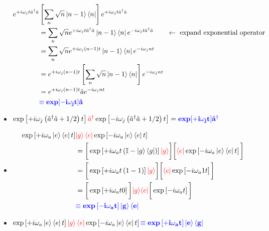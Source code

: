 \begin{itemize}
    \begin{equation}
      \begin{aligned}
  	e^{+i\omega_jt\hat{a}^\dagger\hat a} & \left[\sum_n\sqrt{n}\ket{n-1}\bra{n}\right]e^{+i\omega_jt\hat{a}^\dagger\hat a}\\
  	& = \sum_n \sqrt{n}e^{+i\omega_jt\hat{a}^\dagger\hat a}\ket{n-1}\bra{n}e^{-i\omega_jt\hat{a}^\dagger\hat a} \qquad \leftarrow\text{ expand exponential operator}\\
  	& = \sum_n \sqrt{n}e^{+i\omega_j(n-1)t}\ket{n-1}\bra{n}e^{-i\omega_jnt}\\
  	& = e^{+i\omega_j(n-1)t}\left[\sum_n \sqrt{n}\ket{n-1}\bra{n}\right]e^{-i\omega_jnt}\\
  	&     =    e^{+i\omega_j(n-1)t}\hat{a}e^{-i\omega_jnt}\\     &    \textcolor{blue}{\mathbf{\equiv
            \text{\textbf{exp}}[-i\omega_jt]\hat{a}}}
      \end{aligned}
    \end{equation}
  	
  \item
    $\exp\left[+i\omega_j\left(\hat{a}^\dagger\hat{a}+{1}/{2}\right)t\right]\textcolor{red}{\hat{a}^\dagger}\exp\left[-i\omega_j\left(\hat{a}^\dagger\hat{a}+{1}/{2}\right)t\right]
    = \textcolor{blue}{\mathbf{\text{\textbf{exp}}[+i\omega_jt]\hat{a}^\dagger}}$
  	
  \item \begin{equation}
      \begin{aligned}
  	\exp\left[+i\omega_a\ket{e}\bra{e}t\right]&\textcolor{red}{\ket{g}\bra{e}}\exp\left[-i\omega_a\ket{e}\bra{e}t\right] \\
  	& = \bigg[\exp\left[+i\omega_at\left(\mathbb{I} - \ket{g}\bra{g}\right)\right]\textcolor{red}{\ket{g}}\bigg]\bigg[\textcolor{red}{\bra{e}}\exp\left[-i\omega_a\ket{e}\bra{e}t\right]\bigg]\\
  	& = \bigg[\exp\left[+i\omega_at\left(1 - 1\right)\right]\textcolor{red}{\ket{g}}\bigg]\bigg[\textcolor{red}{\bra{e}}\exp\left[-i\omega_a1t\right]\bigg]\\
  	& = \bigg[\exp\left[+i\omega_at0\right]\bigg]\textcolor{red}{\ket{g}}\textcolor{red}{\bra{e}}\bigg[\exp\left[-i\omega_at\right]\bigg]\\
  	& \textcolor{blue}{\mathbf{\equiv \text{\textbf{exp}}\left[-i\omega_at\right]\ket{g}\bra{e}}}
      \end{aligned}
    \end{equation}
  \item
    $\exp\left[+i\omega_a\ket{e}\bra{e}t\right]\textcolor{red}{\ket{g}\bra{e}}\exp\left[-i\omega_a\ket{e}\bra{e}t\right]
    \textcolor{blue}{\mathbf{\equiv \text{\textbf{exp}}\left[+i\omega_at\right]\ket{e}\bra{g}}} $
  \end{itemize}
  

